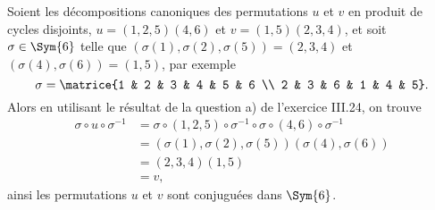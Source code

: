 Soient les décompositions canoniques des permutations $u$ et $v$ en produit de cycles disjoints, $u = (1,2,5)(4,6)$ et $v = (1,5)(2,3,4)$, et soit $\sigma\in\Sym{6}$ telle que $(\sigma(1),\sigma(2),\sigma(5)) = (2,3,4)$ et $(\sigma(4),\sigma(6)) = (1,5)$, par exemple
\[
  \sigma = \matrice{1 & 2 & 3 & 4 & 5 & 6 \\ 2 & 3 & 6 & 1 & 4 & 5}.
\]
Alors en utilisant le résultat de la question a) de l'exercice III.24, on trouve
%
\begin{align*}
    \sigma\circ u\circ\sigma^{-1}
        &= \sigma\circ (1,2,5)\circ\sigma^{-1}\circ\sigma\circ (4,6)\circ\sigma^{-1} \\
        &= (\sigma(1),\sigma(2),\sigma(5))(\sigma(4),\sigma(6)) \\
        &= (2,3,4) (1,5) \\
        &= v,
\end{align*}
%
ainsi les permutations $u$ et $v$ sont conjuguées dans $\Sym{6}$.
